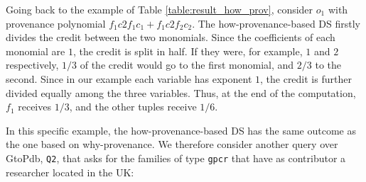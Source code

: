 %


Going back to the example of Table \ref{table:result_how_prov}, consider $o_1$ with provenance polynomial $f_1 c2f_1 c_1 + f_1 c2f_2 c_2$. The how-provenance-based DS firstly divides the credit between the two monomials. Since the coefficients of each monomial are $1$, the credit is split in half. If they were, for example, $1$ and $2$ respectively, $1/3$ of the credit would go to the first monomial, and $2/3$ to the second.  
Since in our example each variable has exponent $1$, the credit is further divided equally among the three variables. Thus, at the end of the computation, $f_1$ receives $1/3$, and the other tuples receive $1/6$.



In this specific example, the how-provenance-based DS has the same outcome as the one based on why-provenance. %
We therefore consider another query over GtoPdb, \texttt{Q2}, that asks for the families of type \texttt{gpcr} that have as contributor a researcher located in the UK:

